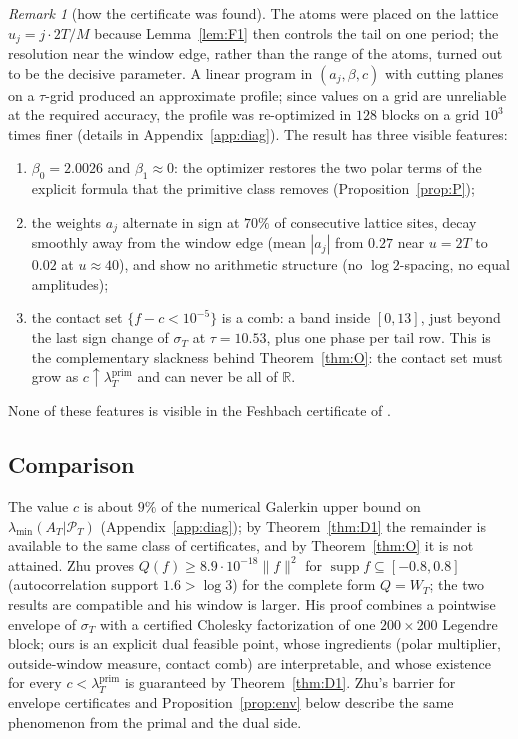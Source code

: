 \documentclass[11pt]{amsart}
\theoremstyle{definition}
\theoremstyle{remark}
\newtheorem{remark}[theorem]{Remark}
\newcommand{\R}{\mathbb R}
\newcommand{\supp}{\operatorname{supp}}
\newcommand{\PT}{\mathcal P_T}
\newcommand{\lamP}{\lambda^{\mathrm{prim}}_T}
\newcommand{\lamA}{\lambda_{\min}(A_T|\PT)}
\newcommand{\sT}{\sigma_T}
\begin{document}
\begin{remark}[how the certificate was found]
The atoms were placed on the lattice $u_j=j\cdot2T/M$ because Lemma~\ref{lem:F1} then controls the
tail on one period; the resolution near the window edge, rather than the range of the atoms, turned
out to be the decisive parameter. A linear program in $(a_j,\beta,c)$ with cutting planes on a
$\tau$-grid produced an approximate profile; since values on a grid are unreliable at the required
accuracy, the profile was re-optimized in $128$ blocks on a grid $10^3$ times finer (details in
Appendix~\ref{app:diag}). The result has three visible features:
\begin{enumerate}
\item $\beta_0=2.0026$ and $\beta_1\approx0$: the optimizer restores the two polar terms of the
explicit formula that the primitive class removes (Proposition~\ref{prop:P});
\item the weights $a_j$ alternate in sign at $70\%$ of consecutive lattice sites, decay smoothly away
from the window edge (mean $|a_j|$ from $0.27$ near $u=2T$ to $0.02$ at $u\approx40$), and show no
arithmetic structure (no $\log2$-spacing, no equal amplitudes);
\item the contact set $\{f-c<10^{-5}\}$ is a comb: a band inside $[0,13]$, just beyond the last
sign change of $\sT$ at $\tau=10.53$, plus one phase per tail row. This is the complementary
slackness behind Theorem~\ref{thm:O}: the contact set must grow as $c\uparrow\lamP$ and can never be
all of $\R$.
\end{enumerate}
None of these features is visible in the Feshbach certificate of \cite{Paper42}.
\end{remark}

\subsection{Comparison}\label{subsec:compare}
The value $c$ is about $9\%$ of the numerical Galerkin upper bound on $\lamA$ (Appendix~\ref{app:diag}); by
Theorem~\ref{thm:D1} the remainder is available to the same class of certificates, and by
Theorem~\ref{thm:O} it is not attained. Zhu \cite[Thm.~1.2]{Zhu2026} proves
$Q(f)\ge8.9\cdot10^{-18}\|f\|^2$ for $\supp f\subseteq[-0.8,0.8]$ (autocorrelation support
$1.6>\log3$) for the complete form $Q=W_T$; the two results are compatible and his window is larger.
His proof combines a pointwise envelope of $\sT$ with a certified Cholesky factorization of one
$200\times200$ Legendre block; ours is an explicit dual feasible point, whose ingredients (polar
multiplier, outside-window measure, contact comb) are interpretable, and whose existence for every
$c<\lamP$ is guaranteed by Theorem~\ref{thm:D1}. Zhu's barrier for envelope certificates
\cite[Thm.~1.4]{Zhu2026} and Proposition~\ref{prop:env} below describe the same phenomenon from the
primal and the dual side.
\end{document}
